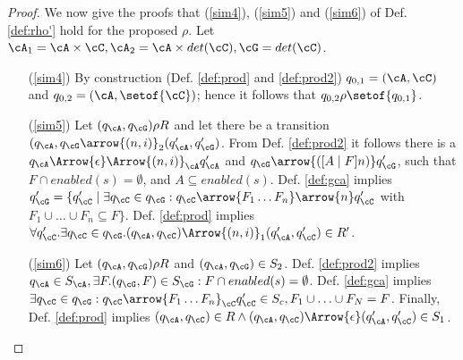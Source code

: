 \begin{proof}
We now give the proofs that (\ref{sim4}), (\ref{sim5}) and (\ref{sim6}) of Def. \ref{def:rho'} hold for the proposed $\rho$. Let $\cA_1 = \cA \times \cC, \cA_2 = \cA \times det(\cC), \cG = det(\cC)$.
\begin{itemize}
\item[(\ref{sim4})]
By construction (Def. \ref{def:prod} and \ref{def:prod2}) $q_{0,1} = (\cA,\cC)$ and $q_{0,2} = (\cA, \setof{\cC})$; hence it follows that $q_{0,2} \rho \setof{ q_{0,1} }$.
\item[(\ref{sim5})]
Let $(q_\cA,q_\cG) \rho R$ and let there be a transition $(q_\cA,q_\cG \arrow{(n,i)}_2 (q_{\cA}',q_{\cG}')$. From Def. \ref{def:prod2} it follows there is a $q_\cA \Arrow{\epsilon}\Arrow{(n,i)}_\cA q_{\cA}'$ and $q_\cG \arrow{([A\mid F]n)} q_{\cG}'$, such that $F \cap enabled(s) = \emptyset$, and $A \subseteq enabled(s)$.
Def. \ref{def:gca} implies $q_{\cG}' = \{ q_{\cC}' \mid \exists q_{\cC} \in q_{\cG}: q_\cC \arrow{F_1 \dotsc F_n} \arrow{n} q_{\cC}'$ with $F_1 \cup \dotsc \cup F_n \subseteq F \}$. 
Def. \ref{def:prod} implies $\forall q_{\cC}'.\exists q_{\cC} \in q_{\cG}. (q_\cA,q_\cC) \Arrow{(n,i)}_1 (q_{\cA}',q_{\cC}') \in R'$. 
\item[(\ref{sim6})]
Let $(q_\cA,q_\cG) \rho R$ and $(q_\cA,q_\cG) \in S_2$.
Def. \ref{def:prod2} implies $q_\cA \in S_\cA, \exists F.(q_\cG,F) \in S_\cG: F \cap enabled(s) = \emptyset$.
Def. \ref{def:gca} implies $\exists q_\cC \in q_\cG: q_\cC \arrow{F_1 \dotsc F_n}_\cC q_{\cC}' \in S_c, F_1 \cup \dotsc \cup F_N = F $.
Finally, Def. \ref{def:prod} implies $(q_\cA,q_\cC) \in R \wedge (q_\cA,q_\cC) \Arrow{\epsilon} (q_{\cA}',q_{\cC}') \in S_1$.
\end{itemize}
\end{proof}
